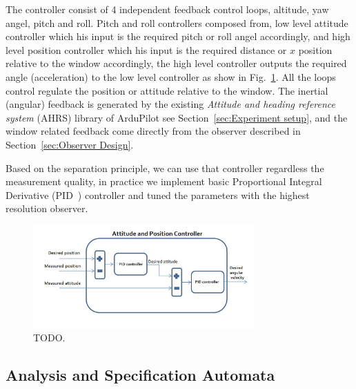 \documentclass{sig-alternate-ipsn13}
\begin{document}
The controller consist of 4 independent feedback control loops, altitude, yaw angel, pitch and roll.
Pitch and roll controllers composed from, low level attitude controller which his input is the required pitch or roll angel accordingly, and high level position controller which his input is the required distance or $x$ position relative to the window accordingly, the high level controller outputs the required angle (acceleration) to the low level controller as show in Fig.~\ref{fig:controllerStracture}.
All the loops control regulate the position or attitude relative to the window.
The inertial (angular) feedback is generated by the existing \textit{Attitude and heading reference system} (AHRS) library of ArduPilot see Section~\ref{sec:Experiment setup}, and the window related feedback come directly from the observer described in Section~\ref{sec:Observer Design}.

Based on the separation principle, we can use that controller regardless the measurement quality, in practice we implement basic Proportional Integral Derivative (PID~\cite{aastrom2006advanced}) controller and tuned the parameters with the highest resolution observer.

\begin{figure}[htbp]
    \centerline{\includegraphics[width=85mm]{controller_from_hanoch.jpg}}
    \caption{TODO.}
    \label{fig:controllerStracture}
\end{figure}







\subsection{Analysis and Specification Automata}
\end{document}

